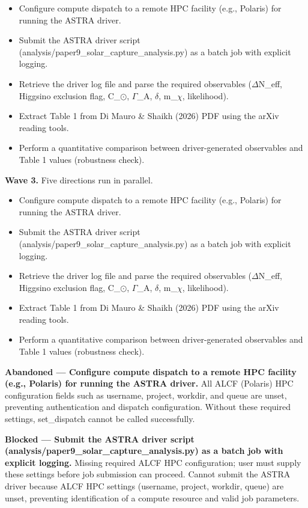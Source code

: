 \documentclass[11pt,a4paper]{article}
\begin{document}
\begin{itemize}
  \item Configure compute dispatch to a remote HPC facility (e.g., Polaris) for running the ASTRA driver.
  \item Submit the ASTRA driver script (analysis/paper9\_solar\_capture\_analysis.py) as a batch job with explicit logging.
  \item Retrieve the driver log file and parse the required observables ($\Delta$N\_eff, Higgsino exclusion flag, C\_$\odot$, $\Gamma$\_A, $\delta$, m\_$\chi$, likelihood).
  \item Extract Table 1 from Di Mauro \& Shaikh (2026) PDF using the arXiv reading tools.
  \item Perform a quantitative comparison between driver-generated observables and Table 1 values (robustness check).
\end{itemize}
\textbf{Wave 3.} Five directions run in parallel.

\begin{itemize}
  \item Configure compute dispatch to a remote HPC facility (e.g., Polaris) for running the ASTRA driver.
  \item Submit the ASTRA driver script (analysis/paper9\_solar\_capture\_analysis.py) as a batch job with explicit logging.
  \item Retrieve the driver log file and parse the required observables ($\Delta$N\_eff, Higgsino exclusion flag, C\_$\odot$, $\Gamma$\_A, $\delta$, m\_$\chi$, likelihood).
  \item Extract Table 1 from Di Mauro \& Shaikh (2026) PDF using the arXiv reading tools.
  \item Perform a quantitative comparison between driver-generated observables and Table 1 values (robustness check).
\end{itemize}
\textbf{Abandoned --- Configure compute dispatch to a remote HPC facility (e.g., Polaris) for running the ASTRA driver.} All ALCF (Polaris) HPC configuration fields such as username, project, workdir, and queue are unset, preventing authentication and dispatch configuration. Without these required settings, set\_dispatch cannot be called successfully.

\textbf{Blocked --- Submit the ASTRA driver script (analysis/paper9\_solar\_capture\_analysis.py) as a batch job with explicit logging.} Missing required ALCF HPC configuration; user must supply these settings before job submission can proceed. Cannot submit the ASTRA driver because ALCF HPC settings (username, project, workdir, queue) are unset, preventing identification of a compute resource and valid job parameters.
\end{document}
